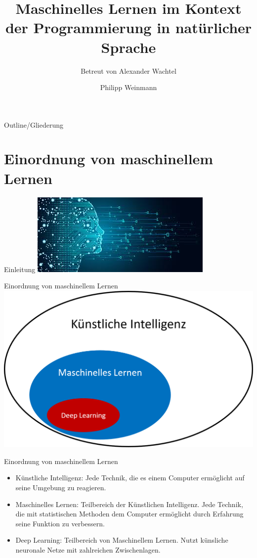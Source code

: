 \documentclass[18pt]{beamer}
\title[Maschinelles Lernen]{Maschinelles Lernen im Kontext der Programmierung in natürlicher Sprache}
\subtitle{Betreut von Alexander Wachtel}
\author{Philipp Weinmann}
\institute{IPD Tichy}
\begin{document}

\begin{frame}
\titlepage
\end{frame}

\begin{frame}{Outline/Gliederung}
\tableofcontents
\end{frame}


\section{Einordnung von maschinellem Lernen}

\begin{frame}{Einleitung}
\includegraphics{images/Hype.jpg}
\cite{Hype}
\end{frame}

\begin{frame}{Einordnung von maschinellem Lernen}
\includegraphics[scale=0.2]{images/MLInAI}
\cite{MLEinordnung}
\end{frame}

\begin{frame}{Einordnung von maschinellem Lernen}
\begin{itemize}
\item{Künstliche Intelligenz: Jede Technik, die es einem Computer ermöglicht auf seine Umgebung zu reagieren.}
\item{Maschinelles Lernen: Teilbereich der Künstlichen Intelligenz. Jede Technik, die mit statistischen Methoden dem Computer ermöglicht durch Erfahrung seine Funktion zu verbessern.}
\item{Deep Learning: Teilbereich von Maschinellem Lernen. Nutzt künsliche neuronale Netze mit zahlreichen Zwischenlagen.}
\end{itemize}
\end{frame}
\end{document}
